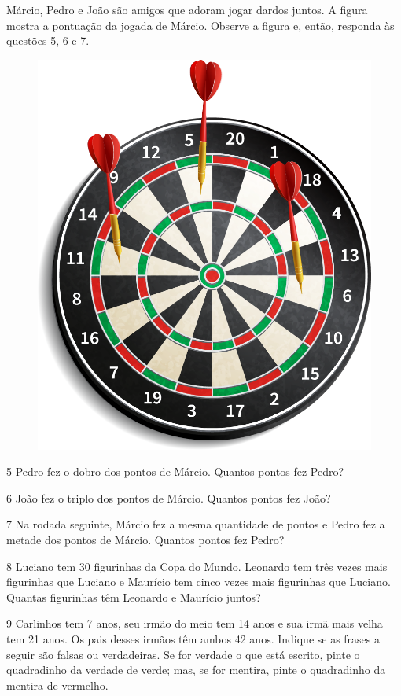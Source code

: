 \pagebreak
Márcio, Pedro e João são amigos que adoram jogar dardos juntos. A figura mostra a pontuação da jogada de Márcio. Observe a figura e, então, responda às questões 5, 6 e 7.

\begin{figure}[htpb!]
\centering
\includegraphics[width=.5\textwidth]{./media/image108.png}
\end{figure}

\num{5} Pedro fez o dobro dos pontos de Márcio. Quantos pontos fez Pedro?

\num{6} João fez o triplo dos pontos de Márcio. Quantos pontos fez João?


\num{7} Na rodada seguinte, Márcio fez a mesma quantidade de pontos e Pedro
  fez a metade dos pontos de Márcio. Quantos pontos fez Pedro?


\num{8} Luciano tem 30 figurinhas da Copa do Mundo. Leonardo tem três
vezes mais figurinhas que Luciano e Maurício tem cinco vezes mais figurinhas que Luciano.
Quantas figurinhas têm Leonardo e Maurício juntos?




\num{9} Carlinhos tem 7 anos, seu irmão do meio tem 14 anos e sua irmã mais
velha tem 21 anos. Os pais desses irmãos têm ambos 42 anos. Indique se
as frases a seguir são falsas ou verdadeiras. Se for verdade o que está
escrito, pinte o quadradinho da verdade de verde; mas, se for mentira,
pinte o quadradinho da mentira de vermelho.


